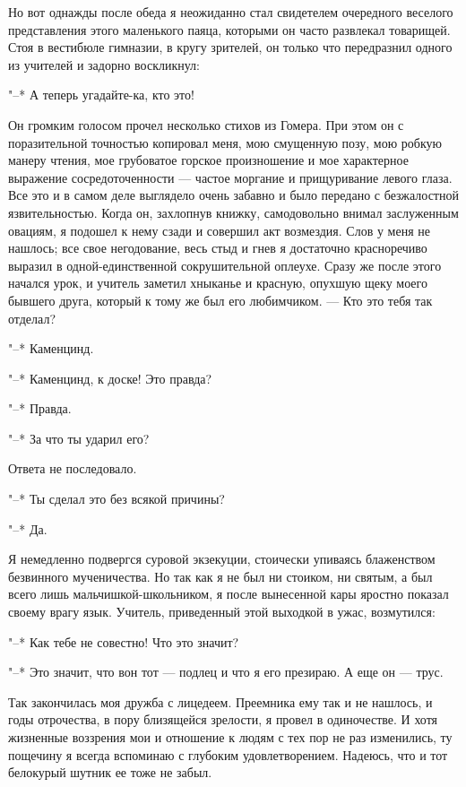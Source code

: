 Но вот  однажды после  обеда я  неожиданно стал  свидетелем очередного
веселого  представления  этого  маленького паяца,  которыми  он  часто
развлекал товарищей. Стоя  в вестибюле гимназии, в  кругу зрителей, он
только что передразнил одного из учителей и задорно воскликнул:

"--* А теперь угадайте-ка, кто это!

Он  громким  голосом  прочел  несколько стихов  из  Гомера.  При  этом
он  с  поразительной точностью  копировал  меня,  мою смущенную  позу,
мою  робкую  манеру  чтения,  мое грубоватое  горское  произношение  и
мое  характерное выражение  сосредоточенности  ---  частое моргание  и
прищуривание  левого глаза.  Все это  и в  самом деле  выглядело очень
забавно  и  было передано  с  безжалостной  язвительностью. Когда  он,
захлопнув книжку, самодовольно внимал заслуженным овациям, я подошел к
нему сзади и совершил акт возмездия.  Слов у меня не нашлось; все свое
негодование,  весь  стыд  и  гнев я  достаточно  красноречиво  выразил
в  одной-единственной сокрушительной  оплеухе.  Сразу  же после  этого
начался урок, и учитель заметил хныканье и красную, опухшую щеку моего
бывшего друга, который к тому же  был его любимчиком. --- Кто это тебя
так отделал?

"--* Каменцинд.

"--* Каменцинд, к доске! Это правда?

"--* Правда.

"--* За что ты ударил его?

Ответа не последовало.

"--* Ты сделал это без всякой причины?

"--* Да.

Я   немедленно  подвергся   суровой   экзекуции,  стоически   упиваясь
блаженством безвинного мученичества.  Но так как я не  был ни стоиком,
ни святым, а был всего  лишь мальчишкой-школьником, я после вынесенной
кары  яростно показал  своему  врагу язык.  Учитель, приведенный  этой
выходкой в ужас, возмутился:

"--* Как тебе не совестно! Что это значит?

"--* Это значит, что вон тот --- подлец и что я его презираю. А еще он
--- трус.

Так закончилась моя дружба с лицедеем. Преемника ему так и не нашлось,
и годы отрочества, в пору близящейся зрелости, я провел в одиночестве.
И хотя жизненные  воззрения мои и отношение  к людям с тех  пор не раз
изменились, ту пощечину я всегда вспоминаю с глубоким удовлетворением.
Надеюсь, что и тот белокурый шутник ее тоже не забыл.

